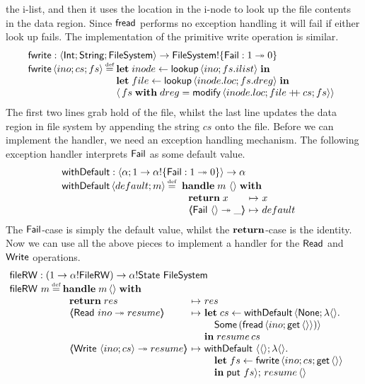 \documentclass[12pt,phd,lfcs,twoside,openright,logo,leftchapter,normalheadings]{infthesis}
\theoremstyle{plain}
\theoremstyle{definition}
\begin{document}
the i-list, and then it uses the location in the i-node to look up the
file contents in the data region. Since $\mathsf{fread}$ performs no exception
handling it will fail if either look up fails. The implementation of
the primitive write operation is similar.
%
\[
  \bl
    \fwrite : \Record{\Int;\String;\FileSystem} \to \FileSystem \eff \{\Fail : \UnitType \opto \ZeroType\}\\
    \fwrite\,\Record{ino;cs;fs} \defas
      \ba[t]{@{}l}
        \Let\;inode \revto \lookup\,\Record{ino; fs.ilist}\;\In\\
        \Let\;file \revto \lookup\,\Record{inode.loc; fs.dreg}\;\In\\
        \Record{\,fs\;\keyw{with}\;dreg = \modify\,\Record{inode.loc;file \concat cs;fs}}
      \el
  \el
\]
%
The first two lines grab hold of the file, whilst the last line
updates the data region in file system by appending the string $cs$
onto the file.
%
Before we can implement the handler, we need an exception handling
mechanism. The following exception handler interprets $\mathsf{Fail}$ as some
default value.
%
\[
    \bl
      \faild : \Record{\alpha;\UnitType \to \alpha \eff \{\Fail : \UnitType \opto \ZeroType\}} \to \alpha\\
      \faild\,\Record{default;m} \defas
        \ba[t]{@{~}l}
          \Handle\;m~\Unit\;\With\\
           ~\ba{@{~}l@{~}c@{~}l}
              \Return\;x &\mapsto& x\\
              \OpCase{\Fail}{\Unit}{\_} &\mapsto& default
            \ea
        \ea
    \el
\]
%
The $\mathsf{Fail}$-case is simply the default value, whilst the
$\mathbf{return}$-case is the identity.
%
Now we can use all the above pieces to implement a handler for the
$\mathsf{Read}$ and $\mathsf{Write}$ operations.
%
\[
  \bl
    \fileRW : (\UnitType \to \alpha \eff \dec{FileRW}) \to \alpha \eff \State~\FileSystem\\
    \fileRW~m \defas
        \ba[t]{@{}l}
           \Handle\;m\,\Unit\;\With\\
             ~\ba{@{~}l@{~}c@{~}l}
                 \Return\;res      &\mapsto& res\\
                 \OpCase{\URead}{ino}{resume} &\mapsto&
                   \bl
                   \Let\;cs\revto \faild\,\Record{\None;\lambda\Unit.\\
                     \quad\Some\,(\fread\,\Record{ino;\Uget\,\Unit})}\\
                     \In\;resume\,cs
                   \el\\
                 \OpCase{\UWrite}{\Record{ino;cs}}{resume} &\mapsto&
                     \ba[t]{@{}l}
                        \faild~\Record{\Unit; \lambda \Unit.\\
                          \quad\bl
                            \Let\;fs \revto \fwrite\,\Record{ino;cs;\Uget\,\Unit}\\
                            \In\;\Uput~fs};\,resume\,\Unit
                          \el
                     \ea
               \ea
         \ea
  \el
\]
\end{document}
